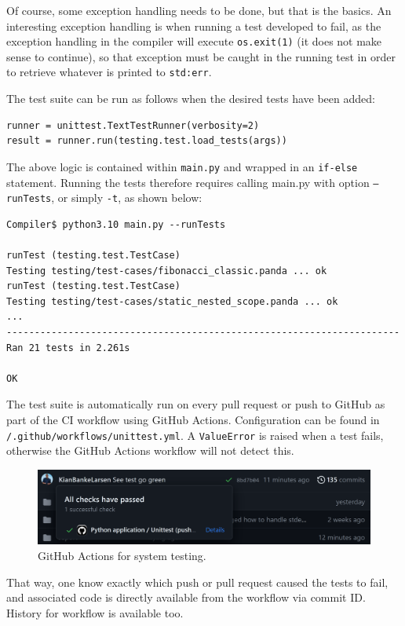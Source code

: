Of course, some exception handling needs to be done, but that is the basics. An interesting exception handling is when running a test developed to fail, as the exception handling in the compiler will execute \texttt{os.exit(1)} (it does not make sense to continue), so that exception must be caught in the running test in order to retrieve whatever is printed to \texttt{std:err}.

The test suite can be run as follows when the desired tests have been added:

\begin{verbatim}
runner = unittest.TextTestRunner(verbosity=2)
result = runner.run(testing.test.load_tests(args))
\end{verbatim}

The above logic is contained within \texttt{main.py} and wrapped in an \texttt{if-else} statement. Running the tests therefore requires calling main.py with option \texttt{--runTests}, or simply \texttt{-t}, as shown below:

\begin{verbatim}
Compiler$ python3.10 main.py --runTests

runTest (testing.test.TestCase)
Testing testing/test-cases/fibonacci_classic.panda ... ok
runTest (testing.test.TestCase)
Testing testing/test-cases/static_nested_scope.panda ... ok
...
----------------------------------------------------------------------
Ran 21 tests in 2.261s

OK 
\end{verbatim}

The test suite is automatically run on every pull request or push to GitHub as part of the CI workflow using GitHub Actions. Configuration can be found in \texttt{/.github/workflows/unittest.yml}. A \texttt{ValueError} is raised when a test fails, otherwise the GitHub Actions workflow will not detect this.

\begin{figure}[H]
    \centering
    \includegraphics[width=1\textwidth]{misc/images/GitHub_Actions.png}
    \caption{GitHub Actions for system testing.}
\end{figure}

That way, one know exactly which push or pull request caused the tests to fail, and associated code is directly available from the workflow via commit ID. History for workflow is available too.

